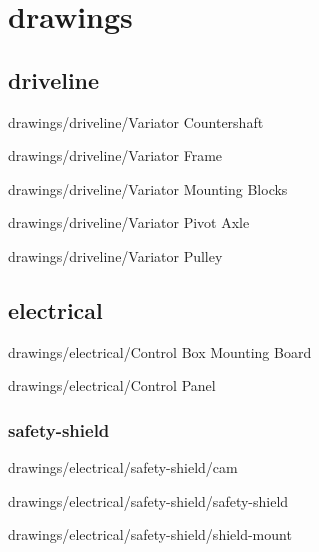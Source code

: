 \chapter{drawings}

\section{driveline}


{drawings/driveline/Variator Countershaft}


{drawings/driveline/Variator Frame}


{drawings/driveline/Variator Mounting Blocks}


{drawings/driveline/Variator Pivot Axle}


{drawings/driveline/Variator Pulley}

\section{electrical}


{drawings/electrical/Control Box Mounting Board}


{drawings/electrical/Control Panel}

\subsection{safety-shield}


{drawings/electrical/safety-shield/cam}


{drawings/electrical/safety-shield/safety-shield}


{drawings/electrical/safety-shield/shield-mount}

